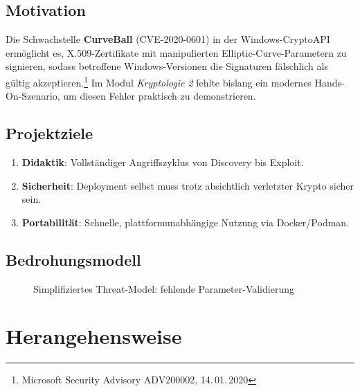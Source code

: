 \documentclass{article}
\begin{document}
\subsection{Motivation}
Die Schwachstelle \textbf{CurveBall} (CVE-2020-0601) in der Windows-CryptoAPI
ermöglicht es, X.509-Zertifikate mit manipulierten Elliptic-Curve-Parametern zu
signieren, sodass betroffene Windows-Versionen die Signaturen fälschlich als
gültig akzeptieren.\footnote{Microsoft Security Advisory ADV200002, 14.\,01.\,2020}
Im Modul \emph{Kryptologie 2} fehlte bislang ein modernes
Hands-On-Szenario, um diesen Fehler praktisch zu demonstrieren.

\subsection{Projektziele}
\begin{enumerate}
  \item \textbf{Didaktik}: Vollständiger Angriffszyklus von Discovery bis Exploit.
  \item \textbf{Sicherheit}: Deployment selbst muss trotz absichtlich verletzter Krypto sicher sein.
  \item \textbf{Portabilität}: Schnelle, plattformunabhängige Nutzung via Docker/Podman.
\end{enumerate}

\subsection{Bedrohungsmodell}
\begin{figure}[H]
  \centering
  \caption{Simplifiziertes Threat-Model: fehlende Parameter-Validierung}
  \label{fig:threatmodel}
\end{figure}

\section{Herangehensweise}
\end{document}
